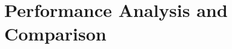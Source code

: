 
\chapter{Performance Analysis and Comparison} %

\label{Chapter3} %

\fancyhead[RO]{\thepage}
\fancyhead[RE]{\thepage}
\fancyhead[LO]{\emph{\ttitle}}


